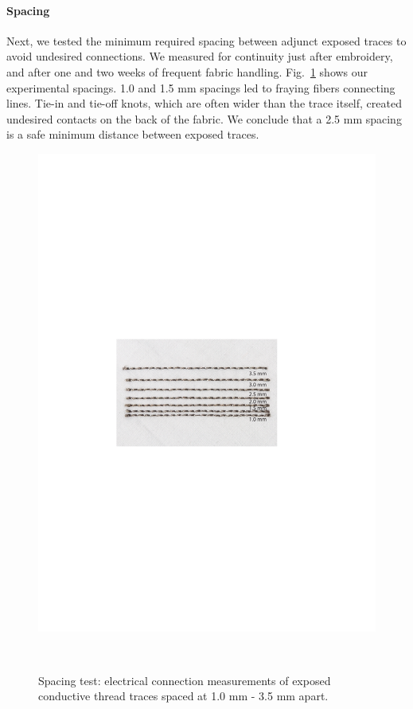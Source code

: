 \documentclass[header.tex]{subfiles}
\begin{document}
\paragraph{Spacing}
Next, we tested the minimum required spacing between adjunct exposed traces to avoid undesired connections. We measured for continuity just after embroidery, and after one and two weeks of frequent fabric handling. Fig.~\ref{fig:Spacing} shows our experimental spacings.  1.0 and 1.5 mm spacings led to fraying fibers connecting lines. Tie-in and tie-off knots, which are often wider than the trace itself, created undesired contacts on the back of the fabric. We conclude that a 2.5 mm spacing is a safe minimum distance between exposed traces.
 \begin{figure}
\centering
  \includegraphics[width=0.8\columnwidth]{figures/Spacing}
  \caption{Spacing test: electrical connection measurements of exposed conductive thread traces spaced at 1.0 mm - 3.5 mm apart.}~\label{fig:Spacing}
  \vspace{-1em}
\end{figure}
\end{document}
